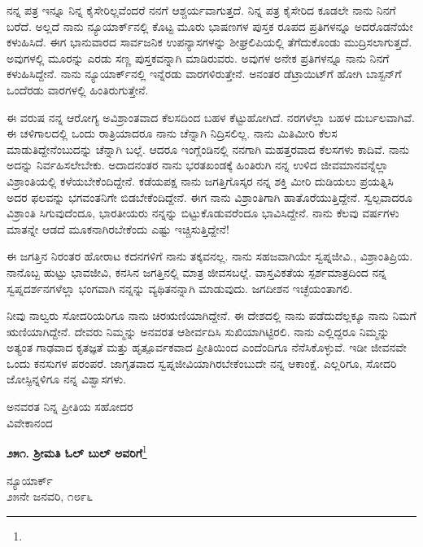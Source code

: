 ನನ್ನ ಪತ್ರ ಇನ್ನೂ ನಿನ್ನ ಕೈಸೇರಿಲ್ಲವೆಂದರೆ ನನಗೆ ಆಶ್ಚರ್ಯವಾಗುತ್ತದೆ. ನಿನ್ನ ಪತ್ರ ಕೈಸೇರಿದ ಕೂಡಲೇ ನಾನು ನಿನಗೆ ಬರೆದೆ. ಅಲ್ಲದೆ ನಾನು ನ್ಯೂಯಾರ್ಕ್‌ನಲ್ಲಿ ಕೊಟ್ಟ ಮೂರು ಭಾಷಣಗಳ ಪುಸ್ತಕ ರೂಪದ ಪ್ರತಿಗಳನ್ನೂ ಅದರೊಡನೆಯೇ ಕಳುಹಿಸಿದೆ. ಈಗ ಭಾನುವಾರದ ಸಾರ್ವಜನಿಕ ಉಪನ್ಯಾಸಗಳನ್ನು ಶೀಘ್ರಲಿಪಿಯಲ್ಲಿ ತೆಗೆದುಕೊಂಡು ಮುದ್ರಿಸಲಾಗುತ್ತದೆ. ಅವುಗಳಲ್ಲಿ ಮೂರನ್ನು ಎರಡು ಸಣ್ಣ ಪುಸ್ತಕವನ್ನಾಗಿ ಮಾಡಿರುವರು. ಅವುಗಳ ಅನೇಕ ಪ್ರತಿಗಳನ್ನೂ ನಾನು ನಿನಗೆ ಕಳುಹಿಸಿದ್ದೇನೆ. ನಾನು ನ್ಯೂಯಾರ್ಕ್‌ನಲ್ಲಿ ಇನ್ನೆರಡು ವಾರಗಳಿರುತ್ತೇನೆ. ಅನಂತರ ಡೆಟ್ರಾಯಿಟ್‌ಗೆ ಹೋಗಿ ಬಾಸ್ಟನ್‌ಗೆ ಒಂದೆರಡು ವಾರಗಳಲ್ಲಿ ಹಿಂತಿರುಗುತ್ತೇನೆ.

ಈ ವರುಷ ನನ್ನ ಆರೋಗ್ಯ ಅವಿಶ್ರಾಂತವಾದ ಕೆಲಸದಿಂದ ಬಹಳ ಕೆಟ್ಟುಹೋಗಿದೆ. ನರಗಳೆಲ್ಲಾ ಬಹಳ ದುರ್ಬಲವಾಗಿವೆ. ಈ ಚಳಿಗಾಲದಲ್ಲಿ ಒಂದು ರಾತ್ರಿಯಾದರೂ ನಾನು ಚೆನ್ನಾಗಿ ನಿದ್ರಿಸಲಿಲ್ಲ. ನಾನು ಮಿತಿಮೀರಿ ಕೆಲಸ ಮಾಡುತಿದ್ದೇನೆಂಬುದನ್ನು ಚೆನ್ನಾಗಿ ಬಲ್ಲೆ. ಆದರೂ ಇಂಗ್ಲೆಂಡಿನಲ್ಲಿ ನನಗಾಗಿ ಮಹತ್ತರವಾದ ಕೆಲಸಗಳು ಕಾದಿವೆ. ನಾನು ಅದನ್ನು ನಿರ್ವಹಿಸಲೇಬೇಕು. ಅದಾದನಂತರ ನಾನು ಭರತಖಂಡಕ್ಕೆ ಹಿಂತಿರುಗಿ ನನ್ನ ಉಳಿದ ಜೀವಮಾನವನ್ನೆಲ್ಲಾ ವಿಶ್ರಾಂತಿಯಲ್ಲಿ ಕಳೆಯಬೇಕೆಂದಿದ್ದೇನೆ. ಕಡೆಯಪಕ್ಷ ನಾನು ಜಗತ್ತಿಗೊಸ್ಕರ ನನ್ನ ಶಕ್ತಿ ಮೀರಿ ದುಡಿಯಲು ಪ್ರಯತ್ನಿಸಿ ಅದರ ಫಲವನ್ನು ಭಗವಂತನಿಗೇ ಬಿಡಬೇಕೆಂದಿದ್ದೇನೆ. ಈಗ ನಾನು ವಿಶ್ರಾಂತಿಗಾಗಿ ಹಾತೊರೆಯುತ್ತಿದ್ದೇನೆ. ಸ್ವಲ್ಪವಾದರೂ ವಿಶ್ರಾಂತಿ ಸಿಗುವುದೆಂದೂ, ಭಾರತೀಯರು ನನ್ನನ್ನು ಬಿಟ್ಟುಕೊಡುವರೆಂದೂ ಭಾವಿಸಿದ್ದೇನೆ. ನಾನು ಕೆಲವು ವರ್ಷಗಳು ಮಾತನ್ನೇ ಆಡದೆ ಮೂಕನಾಗಿರಬೇಕೆಂದು ಎಷ್ಟು ಇಚ್ಚಿಸುತ್ತಿದ್ದೇನೆ!

ಈ ಜಗತ್ತಿನ ನಿರಂತರ ಹೋರಾಟ ಕದನಗಳಿಗೆ ನಾನು ತಕ್ಕವನಲ್ಲ. ನಾನು ಸಹಜವಾಗಿಯೇ ಸ್ವಪ್ನಜೀವಿ., ವಿಶ್ರಾಂತಿಪ್ರಿಯ. ನಾನೊಬ್ಬ ಹುಟ್ಟು ಭಾವಜೀವಿ, ಕನಸಿನ ಜಗತ್ತಿನಲ್ಲಿ ಮಾತ್ರ ಜೀವಸಬಲ್ಲೆ. ವಾಸ್ತವಿಕತೆಯ ಸ್ಪರ್ಶಮಾತ್ರದಿಂದ ನನ್ನ ಸ್ವಪ್ನದರ್ಶನಗಳೆಲ್ಲಾ ಭಂಗವಾಗಿ ನನ್ನನ್ನು ವ್ಯಥಿತನನ್ನಾಗಿ ಮಾಡುವುದು. ಜಗದೀಶನ ಇಚ್ಛೆಯಂತಾಗಲಿ.

ನೀವು ನಾಲ್ವರು ಸೋದರಿಯರಿಗೂ ನಾನು ಚಿರಋಣಿಯಾಗಿದ್ದೇನೆ. ಈ ದೇಶದಲ್ಲಿ ನಾನು ಪಡೆದುದೆಲ್ಲಕ್ಕೂ ನಾನು ನಿಮಗೆ ಋಣಿಯಾಗಿದ್ದೇನೆ. ದೇವರು ನಿಮ್ಮನ್ನು ಅನವರತ ಆಶೀರ್ವದಿಸಿ ಸುಖಿಯಾಗಿಟ್ಟಿರಲಿ. ನಾನು ಎಲ್ಲಿದ್ದರೂ ನಿಮ್ಮನ್ನು ಅತ್ಯಂತ ಗಾಢವಾದ ಕೃತಜ್ಞತೆ ಮತ್ತು ಹೃತ್ಪೂರ್ವಕವಾದ ಪ್ರೀತಿಯಿಂದ ಎಂದೆಂದಿಗೂ ನೆನೆಸಿಕೊಳ್ಳುವೆ. ಇಡೀ ಜೀವನವೇ ಒಂದು ಕನಸುಗಳ ಪರಂಪರೆ. ಜಾಗೃತವಾದ ಸ್ವಪ್ನಜೀವಿಯಾಗಿರಬೇಕೆಂಬುದೇ ನನ್ನ ಆಕಾಂಕ್ಷೆ. ಎಲ್ಲರಿಗೂ, ಸೋದರಿ ಜೋಸ್ಫಿನ್ನಳಿಗೂ ನನ್ನ ವಿಶ್ವಾಸಗಳು.

{\flushright
ಅನವರತ ನಿನ್ನ ಪ್ರೀತಿಯ ಸಹೋದರ\\ವಿವೇಕಾನಂದ\par}

\begin{center}
\textbf{೨೫೧. ಶ‍್ರೀಮತಿ ಓಲ್ ಬುಲ್ ಅವರಿಗೆ}\footnote{}
\end{center}

\begin{flushright}
ನ್ಯೂಯಾರ್ಕ್\\೨೫ನೇ ಜನವರಿ, ೧೮೯೬
\end{flushright}

